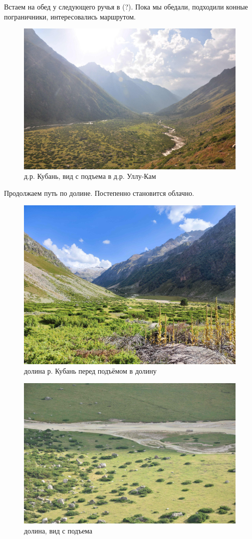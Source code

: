 Встаем на обед у следующего ручья в (?). Пока мы обедали, подходили конные пограничники, интересовались маршрутом.

\begin{figure}[h!]
	\centering
	\includegraphics[width=0.7\linewidth]{../pics/DSC_0464 2.JPG}
	\caption{д.р. Кубань, вид с подъема в д.р. Уллу-Кам}
	\label{fig:DSC_0464 2.JPG}
\end{figure}

Продолжаем путь по долине. Постепенно становится облачно.


\begin{figure}[h!]
	\centering
	\includegraphics[width=0.7\linewidth]{../pics/IMG_20240829_155915.jpg}
	\caption{долина р. Кубань перед подъёмом в долину}
	\label{fig:IMG_20240829_155915.jpg}
\end{figure}

\begin{figure}[h!]
	\centering
	\includegraphics[width=0.7\linewidth]{../pics/DSC_0471 2.JPG}
	\caption{долина, вид с подъема}
	\label{fig:DSC_0471 2.JPG}
\end{figure}

